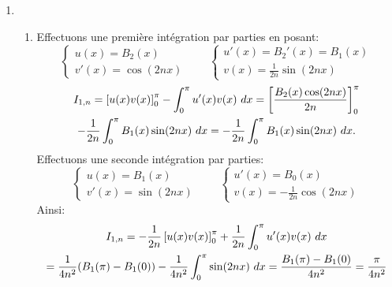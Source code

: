 \begin{enumerate}
\item \begin{enumerate}
           \item Effectuons une première intégration par parties en posant:
           \[ \left \{ \begin{array}{ll}
                        u(x) = B_{2}(x)\\
                        v'(x) = \cos(2nx)
                       \end{array}
               \right. \qquad \left \{ \begin{array}{ll}
                                        u'(x) = B_{2}'(x) = B_{1}(x)\\
                                        v(x) = \frac{1}{2n}\sin(2nx)
                                       \end{array}
                                \right.\]
    \begin{multline*}
      I_{1,n}  = \left [ u(x)v(x)\right ]_{0}^{\pi}-\int_{0}^{\pi}u'(x)v(x) \ dx \notag 
       = \left [ \frac{B_{2}(x)\cos(2nx)}{2n}\right ]_{0}^{\pi} \\ 
       - \frac{1}{2n}\int_{0}^{\pi}B_{1}(x)\sin (2nx)\ dx\notag 
       = -\frac{1}{2n}\int_{0}^{\pi}B_{1}(x)\sin (2nx)\ dx. \notag
    \end{multline*}
    Effectuons une seconde intégration par parties:
    \[ \left \{ \begin{array}{ll}
                 u(x) = B_{1}(x)\\
                 v'(x) = \sin (2nx)
                \end{array}
          \right. \qquad \left \{ \begin{array}{ll}
                                   u'(x) = B_{0}(x)\\
                                   v(x) = -\frac{1}{2n}\cos(2nx)
                                  \end{array}
                          \right.\]
     Ainsi:
     \begin{multline*}
       I_{1,n}   = -\frac{1}{2n}\left [ u(x)v(x)\right ]_{0}^{\pi} + \frac{1}{2n}\int_{0}^{\pi}u'(x)v(x)\ dx\notag\\
       = \frac{1}{4n^{2}}(B_{1}(\pi) - B_{1}(0)) - \frac{1}{4n^{2}}\int_{0}^{\pi}\sin (2nx)\ dx \notag 
        = \frac{B_{1}(\pi) - B_{1}(0)}{4n^{2}}\notag 
        = \frac{\pi}{4n^{2}}\notag
     \end{multline*}
     

\end{enumerate}
\end{enumerate}
